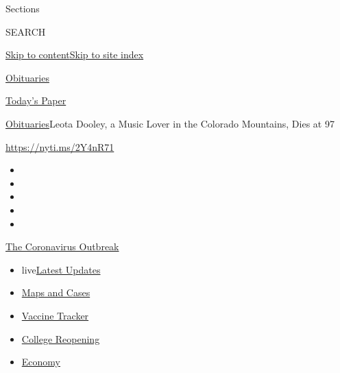 Sections

SEARCH

\protect\hyperlink{site-content}{Skip to
content}\protect\hyperlink{site-index}{Skip to site index}

\href{https://www.nytimes3xbfgragh.onion/section/obituaries}{Obituaries}

\href{https://myaccount.nytimes3xbfgragh.onion/auth/login?response_type=cookie\&client_id=vi}{}

\href{https://www.nytimes3xbfgragh.onion/section/todayspaper}{Today's
Paper}

\href{/section/obituaries}{Obituaries}\textbar{}Leota Dooley, a Music
Lover in the Colorado Mountains, Dies at 97

\url{https://nyti.ms/2Y4nR71}

\begin{itemize}
\item
\item
\item
\item
\item
\end{itemize}

\href{https://www.nytimes3xbfgragh.onion/news-event/coronavirus?action=click\&pgtype=Article\&state=default\&region=TOP_BANNER\&context=storylines_menu}{The
Coronavirus Outbreak}

\begin{itemize}
\tightlist
\item
  live\href{https://www.nytimes3xbfgragh.onion/2020/08/04/world/coronavirus-covid-19.html?action=click\&pgtype=Article\&state=default\&region=TOP_BANNER\&context=storylines_menu}{Latest
  Updates}
\item
  \href{https://www.nytimes3xbfgragh.onion/interactive/2020/us/coronavirus-us-cases.html?action=click\&pgtype=Article\&state=default\&region=TOP_BANNER\&context=storylines_menu}{Maps
  and Cases}
\item
  \href{https://www.nytimes3xbfgragh.onion/interactive/2020/science/coronavirus-vaccine-tracker.html?action=click\&pgtype=Article\&state=default\&region=TOP_BANNER\&context=storylines_menu}{Vaccine
  Tracker}
\item
  \href{https://www.nytimes3xbfgragh.onion/2020/08/02/us/covid-college-reopening.html?action=click\&pgtype=Article\&state=default\&region=TOP_BANNER\&context=storylines_menu}{College
  Reopening}
\item
  \href{https://www.nytimes3xbfgragh.onion/live/2020/08/03/business/stock-market-today-coronavirus?action=click\&pgtype=Article\&state=default\&region=TOP_BANNER\&context=storylines_menu}{Economy}
\end{itemize}

